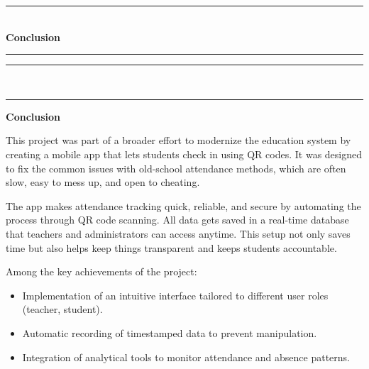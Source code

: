 \documentclass[12pt,a4paper]{report}
\begin{document}
\setcounter{chapter}{3}

{}

\vspace*{\fill}
\begin{center}
    {\color{mintgreen} \rule{\textwidth}{2pt} }\\[0.5cm]
    {\Huge \textbf{Conclusion}}\\[0.5cm]
    {\color{mintgreen} \rule{0.8\textwidth}{1.5pt} }
\end{center}
\vspace*{\fill}
\begin{center}
    {\color{mintgreen} \rule{0.8\textwidth}{1.5pt} }\\[0.3cm]
    {\color{mintgreen} \rule{\textwidth}{2pt} }
\end{center}
\vspace{0.3cm}


\newpage
\begin{tcolorbox}[
    colback=mintgreen!20, 
    colframe=mintgreen!80!black, 
    width=\textwidth, 
    boxrule=1pt, 
    arc=5pt, 
    auto outer arc,
    left=10pt,
    right=10pt,
    top=6pt,
    bottom=6pt
]
    \centering
    \Large \textbf{Conclusion}
\end{tcolorbox}

\vspace{0.5cm} %


This project was part of a broader effort to modernize the education system by creating a mobile app that lets students check in using QR codes. It was designed to fix the common issues with old-school attendance methods, which are often slow, easy to mess up, and open to cheating.

The app makes attendance tracking quick, reliable, and secure by automating the process through QR code scanning. All data gets saved in a real-time database that teachers and administrators can access anytime. This setup not only saves time but also helps keep things transparent and keeps students accountable.

Among the key achievements of the project:
\begin{itemize}
  \item Implementation of an intuitive interface tailored to different user roles (teacher, student).
  \item Automatic recording of timestamped data to prevent manipulation.
  \item Integration of analytical tools to monitor attendance and absence patterns.
\end{itemize}
\end{document}
